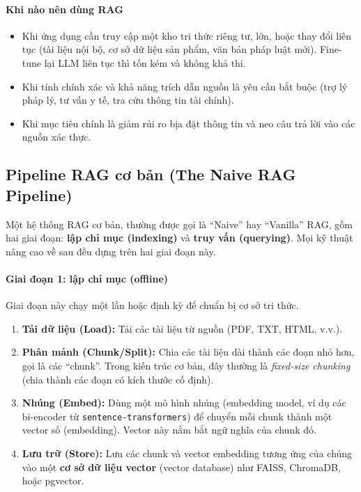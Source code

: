 \paragraph{Khi nào nên dùng RAG}
\begin{itemize}
	\item Khi ứng dụng cần truy cập một kho tri thức riêng tư, lớn, hoặc thay đổi liên tục (tài liệu nội bộ, cơ sở dữ liệu sản phẩm, văn bản pháp luật mới). Fine-tune lại LLM liên tục thì tốn kém và không khả thi.
	\item Khi tính chính xác và khả năng trích dẫn nguồn là yêu cầu bắt buộc (trợ lý pháp lý, tư vấn y tế, tra cứu thông tin tài chính).
	\item Khi mục tiêu chính là giảm rủi ro bịa đặt thông tin và neo câu trả lời vào các nguồn xác thực.
\end{itemize}

\subsection{Pipeline RAG cơ bản (The Naive RAG Pipeline)}
\label{ssec:naive_rag}
Một hệ thống RAG cơ bản, thường được gọi là “Naive” hay “Vanilla” RAG, gồm hai giai đoạn: \textbf{lập chỉ mục (indexing)} và \textbf{truy vấn (querying)}. Mọi kỹ thuật nâng cao về sau đều dựng trên hai giai đoạn này.

\paragraph{Giai đoạn 1: lập chỉ mục (offline)}
Giai đoạn này chạy một lần hoặc định kỳ để chuẩn bị cơ sở tri thức.
\begin{enumerate}
	\item \textbf{Tải dữ liệu (Load):} Tải các tài liệu từ nguồn (PDF, TXT, HTML, v.v.).
	\item \textbf{Phân mảnh (Chunk/Split):} Chia các tài liệu dài thành các đoạn nhỏ hơn, gọi là các “chunk”. Trong kiến trúc cơ bản, đây thường là \textit{fixed-size chunking} (chia thành các đoạn có kích thước cố định).
	\item \textbf{Nhúng (Embed):} Dùng một mô hình nhúng (embedding model, ví dụ các bi-encoder từ \texttt{sentence-\allowbreak transformers}) để chuyển mỗi chunk thành một vector số (embedding). Vector này nắm bắt ngữ nghĩa của chunk đó.
	\item \textbf{Lưu trữ (Store):} Lưu các chunk và vector embedding tương ứng của chúng vào một \textbf{cơ sở dữ liệu vector} (vector database) như FAISS, ChromaDB, hoặc pgvector.
\end{enumerate}

